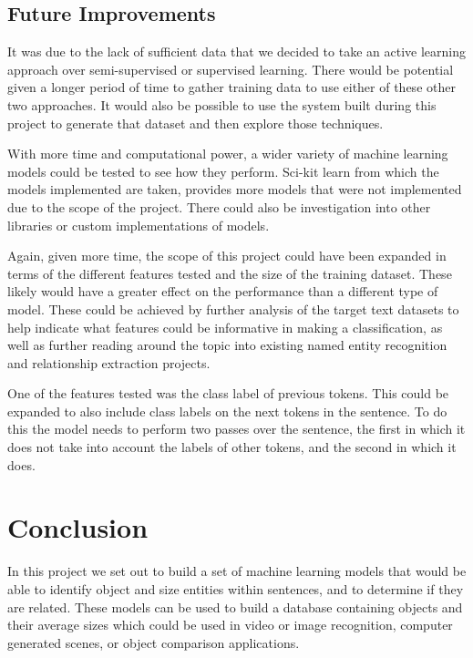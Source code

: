 \documentclass[11pt,oneside]{book}
\begin{document}
\section{Future Improvements}
It was due to the lack of sufficient data that we decided to take an active learning approach over semi-supervised or supervised learning. There would be potential given a longer period of time to gather training data to use either of these other two approaches. It would also be possible to use the system built during this project to generate that dataset and then explore those techniques.

With more time and computational power, a wider variety of machine learning models could be tested to see how they perform. Sci-kit learn from which the models implemented are taken, provides more models that were not implemented due to the scope of the project. There could also be investigation into other libraries or custom implementations of models.

Again, given more time, the scope of this project could have been expanded in terms of the different features tested and the size of the training dataset. These likely would have a greater effect on the performance than a different type of model. These could be achieved by further analysis of the target text datasets to help indicate what features could be informative in making a classification, as well as further reading around the topic into existing named entity recognition and relationship extraction projects.

One of the features tested was the class label of previous tokens. This could be expanded to also include class labels on the next tokens in the sentence. To do this the model needs to perform two passes over the sentence, the first in which it does not take into account the labels of other tokens, and the second in which it does.

\chapter{Conclusion}
In this project we set out to build a set of machine learning models that would be able to identify object and size entities within sentences, and to determine if they are related. These models can be used to build a database containing objects and their average sizes which could be used in video or image recognition, computer generated scenes, or object comparison applications. \\
\end{document}
